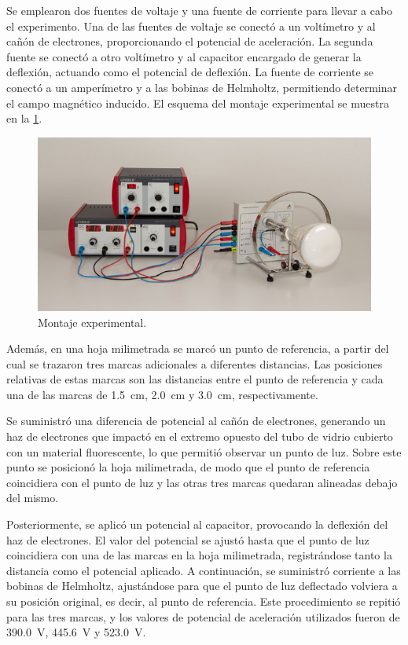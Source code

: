 Se emplearon dos fuentes de voltaje y una fuente de corriente para llevar a cabo
el experimento.
Una de las fuentes de voltaje se conectó a un voltímetro y al cañón de
electrones, proporcionando el potencial de aceleración.
La segunda fuente se conectó a otro voltímetro y al capacitor encargado de
generar la deflexión, actuando como el potencial de deflexión.
La fuente de corriente se conectó a un amperímetro y a las bobinas de Helmholtz,
permitiendo determinar el campo magnético inducido.
El esquema del montaje experimental se muestra en la \cref{fig:set-up}.

\begin{figure}[htbp!]
  \centering
  \includegraphics[width=0.8\linewidth]{./images/braun-tube.jpg}
  \caption{Montaje experimental.}
  \label{fig:set-up}
\end{figure}

Además, en una hoja milimetrada se marcó un punto de referencia, a partir del
cual se trazaron tres marcas adicionales a diferentes distancias.
Las posiciones relativas de estas marcas son las distancias entre el punto de
referencia y cada una de las marcas de \qty{1.5}{\centi m}, \qty{2.0}{\centi m}
y \qty{3.0}{\centi m}, respectivamente.

Se suministró una diferencia de potencial al cañón de electrones, generando un
haz de electrones que impactó en el extremo opuesto del tubo de vidrio cubierto
con un material fluorescente, lo que permitió observar un punto de luz.
Sobre este punto se posicionó la hoja milimetrada, de modo que el punto de
referencia coincidiera con el punto de luz y las otras tres marcas quedaran
alineadas debajo del mismo.

Posteriormente, se aplicó un potencial al capacitor, provocando la deflexión del
haz de electrones.
El valor del potencial se ajustó hasta que el punto de luz coincidiera con una
de las marcas en la hoja milimetrada, registrándose tanto la distancia como el
potencial aplicado.
A continuación, se suministró corriente a las bobinas de Helmholtz, ajustándose
para que el punto de luz deflectado volviera a su posición original, es decir,
al punto de referencia.
Este procedimiento se repitió para las tres marcas, y los valores de potencial
de aceleración utilizados fueron de \qty{390.0}{V}, \qty{445.6}{V} y \qty{523.0}{V}.
